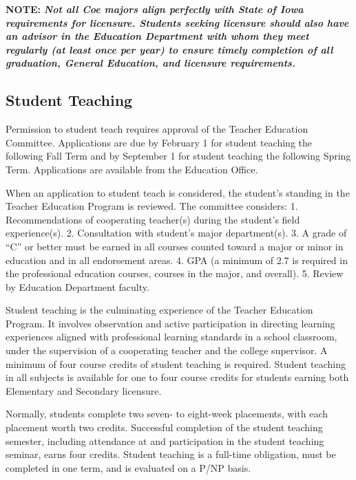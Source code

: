 \documentclass[
  letterpaper,
]{scrbook}
\begin{document}
\textbf{NOTE:} \textbf{\emph{Not all Coe majors align perfectly with
State of Iowa requirements for licensure. Students seeking licensure
should also have an advisor in the Education Department with whom they
meet regularly (at least once per year) to ensure timely completion of
all graduation, General Education, and licensure requirements.}}

\subsection{Student Teaching}\label{student-teaching}

Permission to student teach requires approval of the Teacher Education
Committee. Applications are due by February 1 for student teaching the
following Fall Term and by September 1 for student teaching the
following Spring Term. Applications are available from the Education
Office.

When an application to student teach is considered, the student's
standing in the Teacher Education Program is reviewed. The committee
considers: 1. Recommendations of cooperating teacher(s) during the
student's field experience(s). 2. Consultation with student's major
department(s). 3. A grade of ``C'' or better must be earned in all
courses counted toward a major or minor in education and in all
endorsement areas. 4. GPA (a minimum of 2.7 is required in the
professional education courses, courses in the major, and overall). 5.
Review by Education Department faculty.

Student teaching is the culminating experience of the Teacher Education
Program. It involves observation and active participation in directing
learning experiences aligned with professional learning standards in a
school classroom, under the supervision of a cooperating teacher and the
college supervisor. A minimum of four course credits of student teaching
is required. Student teaching in all subjects is available for one to
four course credits for students earning both Elementary and Secondary
licensure.

Normally, students complete two seven- to eight-week placements, with
each placement worth two credits. Successful completion of the student
teaching semester, including attendance at and participation in the
student teaching seminar, earns four credits. Student teaching is a
full-time obligation, must be completed in one term, and is evaluated on
a P/NP basis.
\end{document}
